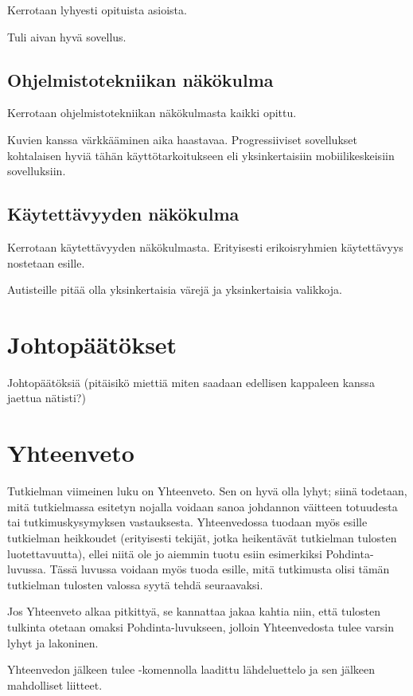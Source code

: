 \documentclass[utf8]{gradu3}
\begin{document}
Kerrotaan lyhyesti opituista asioista.

Tuli aivan hyvä sovellus.

\section{Ohjelmistotekniikan näkökulma}

Kerrotaan ohjelmistotekniikan näkökulmasta kaikki opittu.

Kuvien kanssa värkkääminen aika haastavaa. Progressiiviset sovellukset kohtalaisen hyviä tähän käyttötarkoitukseen eli yksinkertaisiin mobiilikeskeisiin sovelluksiin.

\section{Käytettävyyden näkökulma}

Kerrotaan käytettävyyden näkökulmasta. Erityisesti erikoisryhmien käytettävyys nostetaan esille.

Autisteille pitää olla yksinkertaisia värejä ja yksinkertaisia valikkoja.

\chapter{Johtopäätökset}

Johtopäätöksiä (pitäisikö miettiä miten saadaan edellisen kappaleen kanssa jaettua nätisti?)

\chapter{Yhteenveto}

Tutkielman viimeinen luku on Yhteenveto.  Sen on hyvä olla lyhyt;
siinä todetaan, mitä tutkielmassa esitetyn nojalla voidaan sanoa
johdannon väitteen totuudesta tai tutkimuskysymyksen vastauksesta.
Yhteenvedossa tuodaan myös esille tutkielman heikkoudet (erityisesti
tekijät, jotka heikentävät tutkielman tulosten luotettavuutta), ellei
niitä ole jo aiemmin tuotu esiin esimerkiksi Pohdinta-luvussa.  Tässä
luvussa voidaan myös tuoda esille, mitä tutkimusta olisi tämän
tutkielman tulosten valossa syytä tehdä seuraavaksi.

Jos Yhteenveto alkaa pitkittyä, se kannattaa jakaa kahtia niin, että
tulosten tulkinta otetaan omaksi Pohdinta-luvukseen, jolloin
Yhteenvedosta tulee varsin lyhyt ja lakoninen.

Yhteenvedon jälkeen tulee \string\printbibliography-komennolla
laadittu lähdeluettelo ja sen jälkeen mahdolliset liitteet.
\end{document}
